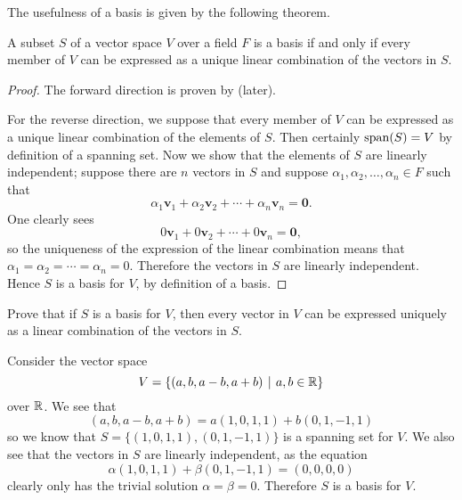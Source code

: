 The usefulness of a basis is given by the following theorem.

\begin{theorem}\label{thrm-basis-iff-has-unique-linear-combinatio}
    A subset $S$ of a vector space $V$ over a field $F$ is a basis if and only if every member of $V$ can be expressed as a unique linear combination of the vectors in $S$.
\end{theorem}
\begin{proof}
    The forward direction is proven by  (later).

    For the reverse direction, we suppose that every member of $V$ can be expressed as a unique linear combination of the elements of $S$. Then certainly $\mathrm{span}(S) = V$ by definition of a spanning set. Now we show that the elements of $S$ are linearly independent; suppose there are $n$ vectors in $S$ and suppose $\alpha_1, \alpha_2, \dots, \alpha_n \in F$ such that
    \[
        \alpha_1\textbf{v}_1 + \alpha_2\textbf{v}_2 + \cdots + \alpha_n\textbf{v}_n = \textbf{0}.
    \]
    One clearly sees
    \[
        0\textbf{v}_1 + 0\textbf{v}_2 + \cdots + 0\textbf{v}_n = \textbf{0},
    \]
    so the uniqueness of the expression of the linear combination means that $\alpha_1 = \alpha_2 = \cdots = \alpha_n = 0$. Therefore the vectors in $S$ are linearly independent. Hence $S$ is a basis for $V$, by definition of a basis.
\end{proof}

\begin{exercise}\label{exercise-basis-means-unique-linear-combination}
    Prove that if $S$ is a basis for $V$, then every vector in $V$ can be expressed uniquely as a linear combination of the vectors in $S$.
\end{exercise}

\begin{example}
    Consider the vector space
    \[
        V = \{(a, b, a-b, a+b) \vert a, b \in \R\}
    \]
    over $\mathbb{R}$. We see that
    \[
        (a, b, a-b, a+b) = a(1, 0, 1, 1) + b(0, 1, -1, 1)
    \]
    so we know that $S = \{(1, 0, 1, 1), (0, 1, -1, 1)\}$ is a spanning set for $V$. We also see that the vectors in $S$ are linearly independent, as the equation
    \[
        \alpha(1, 0, 1, 1) + \beta(0, 1, -1, 1) = (0, 0, 0, 0)
    \]
    clearly only has the trivial solution $\alpha = \beta = 0$. Therefore $S$ is a basis for $V$.
\end{example}


